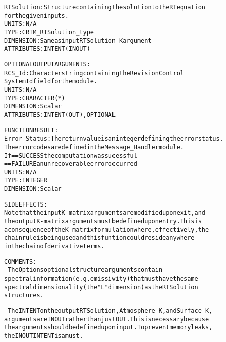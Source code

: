 \begin{alltt}
        RTSolution:     Structure containing the solution to the RT equation
                        for the given inputs.
                        UNITS:      N/A
                        TYPE:       CRTM_RTSolution_type
                        DIMENSION:  Same as input RTSolution_K argument
                        ATTRIBUTES: INTENT(IN OUT)
 
  OPTIONAL OUTPUT ARGUMENTS:
        RCS_Id:         Character string containing the Revision Control
                        System Id field for the module.
                        UNITS:      N/A
                        TYPE:       CHARACTER(*)
                        DIMENSION:  Scalar
                        ATTRIBUTES: INTENT(OUT), OPTIONAL
 
  FUNCTION RESULT:
        Error_Status:   The return value is an integer defining the error status.
                        The error codes are defined in the Message_Handler module.
                        If == SUCCESS the computation was sucessful
                           == FAILURE an unrecoverable error occurred
                        UNITS:      N/A
                        TYPE:       INTEGER
                        DIMENSION:  Scalar
 
  SIDE EFFECTS:
       Note that the input K-matrix arguments are modified upon exit, and
       the output K-matrix arguments must be defined upon entry. This is
       a consequence of the K-matrix formulation where, effectively, the
       chain rule is being used and this funtion could reside anywhere
       in the chain of derivative terms.
 
  COMMENTS:
        - The Options optional structure arguments contain
          spectral information (e.g. emissivity) that must have the same
          spectral dimensionality (the "L" dimension) as the RTSolution
          structures.
 
        - The INTENT on the output RTSolution, Atmosphere_K, and Surface_K,
          arguments are IN OUT rather than just OUT. This is necessary because
          the arguments should be defined upon input. To prevent memory leaks,
          the IN OUT INTENT is a must.
 
  \end{alltt}
